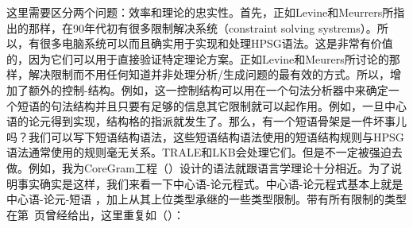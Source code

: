 这里需要区分两个问题：效率和理论的忠实性。首先，正如Levine和Meurrers所指出的那样，在90年代初有很多限制解决系统（constraint solving systrems）。所以，有很多电脑系统可以而且确实用于实现和处理HPSG语法。这是非常有价值的，因为它们可以用于直接验证特定理论方案。正如Levine和Meurers所讨论的那样，解决限制而不用任何知道并非处理分析/生成问题的最有效的方式。所以，增加了额外的控制-结构。例如，这一控制结构可以用在一个句法分析器中来确定一个短语的句法结构并且只要有足够的信息其它限制就可以起作用。例如，一旦中心语的论元得到实现，结构格的指派就发生了。那么，有一个短语骨架是一件坏事儿吗？我们可以写下短语结构语法，这些短语结构语法使用的短语结构规则与HPSG语法通常使用的规则毫无关系。TRALE\citep*{MPR2002a-u,Penn2004a-u}和LKB会处理它们。但是不一定被强迫去做。例如，我为CoreGram工程（\citep{MuellerCoreGramBrief,MuellerCoreGram}）设计的语法就跟语言学理论十分相近。为了说明事实确实是这样，我们来看一下中心语-论元程式。中心语-论元程式基本上就是中心语-论元-短语 ，加上从其上位类型承继的一些类型限制。带有所有限制的类型在第~\pageref{head-arg-schema-hfp}页曾经给出，这里重复如（）：
